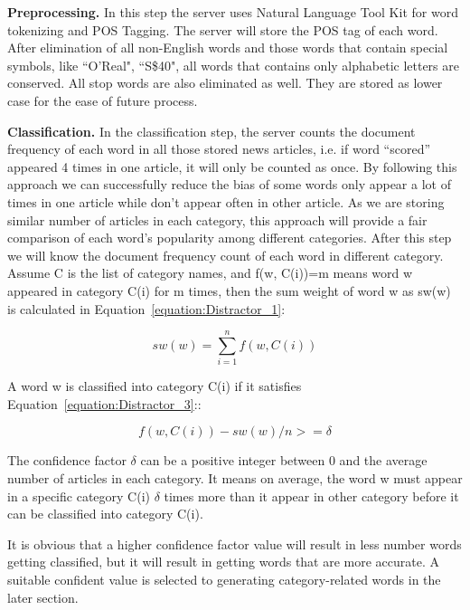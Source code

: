 {\bf Preprocessing.}
In this step the server uses Natural Language Tool Kit \cite{edw09} for word tokenizing and POS Tagging. The server will store the POS tag of each word. After elimination of all non-English words and those words that contain special symbols, like ``O’Real", ``S\$40", all words that contains only alphabetic letters are conserved. All stop words are also eliminated as well. They are stored as lower case for the ease of future process.

{\bf Classification.}
In the classification step, the server counts the document frequency of each word in all those stored news articles, i.e. if word “scored” appeared 4 times in one article, it will only be counted as once. By following this approach we can successfully reduce the bias of some words only appear a lot of times in one article while don’t appear often in other article. As we are storing similar number of articles in each category, this approach will provide a fair comparison of each word’s popularity among different categories. After this step we will know the document frequency count of each word in different category. 
Assume C is the list of category names, and f(w, C(i))=m means word w appeared in category C(i) for m times, then the sum weight of word w as sw(w) is calculated in Equation~\ref{equation:Distractor_1}:

\begin{equation}
sw (w) = \sum_{i=1}^{n} f(w,C(i))
\label{equation:Distractor_1}
\end{equation}  

A word w is classified into category C(i) if it satisfies Equation~\ref{equation:Distractor_3}::

\begin{equation}
f (w, C(i)) - sw(w)/n >= \delta
\label{equation:Distractor_3} 
\end{equation}  

The confidence factor $\delta$ can be a positive integer between 0 and the average number of articles in each category. It means on average, the word w must appear in a specific category C(i) $\delta$ times more than it appear in other category before it can be classified into category C(i).

It is obvious that a higher confidence factor value will result in less number words getting classified, but it will result in getting words that are more accurate. A suitable confident value is selected to generating category-related words in the later section.





